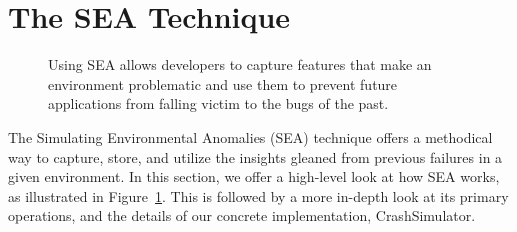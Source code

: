 \section{The SEA Technique}
\label{SEC:approach}

\begin{figure}[t]
  \center{}
  \caption{Using SEA allows developers to capture features that make an
    environment problematic and use them to prevent future applications
    from falling victim to the bugs of the past.}
  \label{figure:approach}
\end{figure}

The Simulating Environmental Anomalies (SEA) technique
offers a methodical way to
capture, store, and utilize the insights gleaned from
previous failures in a given environment.
In this section, we offer a high-level look at how
SEA works, as illustrated in Figure~\ref{figure:approach}.
This is followed by a more in-depth look at its primary operations,
and the details of our concrete implementation, CrashSimulator.

